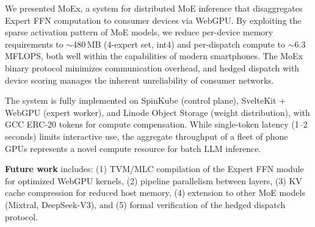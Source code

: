 \documentclass[11pt,a4paper]{article}
\begin{document}
We presented MoEx, a system for distributed MoE inference that
disaggregates Expert FFN computation to consumer devices via WebGPU.
By exploiting the sparse activation pattern of MoE models, we reduce
per-device memory requirements to $\sim$480\,MB (4-expert set,
int4) and per-dispatch compute to $\sim$6.3\,MFLOPS, both well within
the capabilities of modern smartphones. The MoEx binary protocol
minimizes communication overhead, and hedged dispatch with device
scoring manages the inherent unreliability of consumer networks.

The system is fully implemented on SpinKube (control plane),
SvelteKit + WebGPU (expert worker), and Linode Object Storage
(weight distribution), with GCC ERC-20 tokens for compute
compensation. While single-token latency (1--2 seconds) limits
interactive use, the aggregate throughput of a fleet of phone GPUs
represents a novel compute resource for batch LLM inference.

\textbf{Future work} includes: (1) TVM/MLC compilation of the Expert
FFN module for optimized WebGPU kernels, (2) pipeline parallelism
between layers, (3) KV cache compression for reduced host memory,
(4) extension to other MoE models (Mixtral, DeepSeek-V3), and
(5) formal verification of the hedged dispatch protocol.


\end{document}

